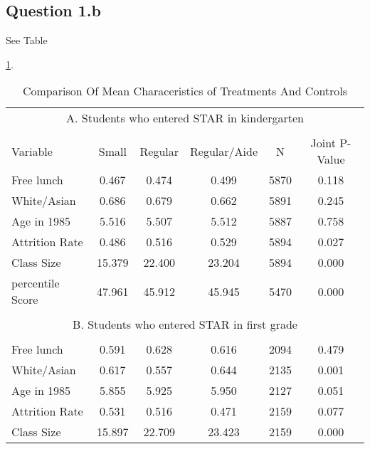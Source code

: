 \documentclass{article}
\begin{document}
{{\subsection*{Question 1.b}

See Table {\ref{tab:sub3}.


\begin{table}[htbp]
  \centering
  \caption{Comparison Of Mean Characeristics of Treatments And Controls}
  \label{tab:sub3}
    \begin{tabular}{llccccc}
    \toprule
    \multicolumn{7}{c}{A. Students who entered STAR in kindergarten} \\
          &       &       &       &       &       &  \\
    \multicolumn{2}{l}{Variable} & Small & Regular & Regular/Aide & N     & Joint P-Value \\
    \midrule
    \multicolumn{2}{l}{Free lunch} & 0.467  & 0.474  & 0.499  & 5870  & 0.118  \\
    \multicolumn{2}{l}{White/Asian} & 0.686  & 0.679  & 0.662  & 5891  & 0.245  \\
    \multicolumn{2}{l}{Age in 1985} & 5.516  & 5.507  & 5.512  & 5887  & 0.758  \\
    \multicolumn{2}{l}{Attrition Rate} & 0.486  & 0.516  & 0.529  & 5894  & 0.027  \\
    \multicolumn{2}{l}{Class Size} & 15.379  & 22.400  & 23.204  & 5894  & 0.000  \\
    \multicolumn{2}{l}{percentile Score} & 47.961  & 45.912  & 45.945  & 5470  & 0.000  \\
          &       &       &       &       &       &  \\
    \multicolumn{7}{c}{B. Students who entered STAR in first grade} \\
    \multicolumn{2}{c}{} &       &       &       &       &  \\
    \multicolumn{2}{l}{Free lunch} & 0.591  & 0.628  & 0.616  & 2094  & 0.479  \\
    \multicolumn{2}{l}{White/Asian} & 0.617  & 0.557  & 0.644  & 2135  & 0.001  \\
    \multicolumn{2}{l}{Age in 1985} & 5.855  & 5.925  & 5.950  & 2127  & 0.051  \\
    \multicolumn{2}{l}{Attrition Rate} & 0.531  & 0.516  & 0.471  & 2159  & 0.077  \\
    \multicolumn{2}{l}{Class Size} & 15.897  & 22.709  & 23.423  & 2159  & 0.000  \\

\end{tabular}
\end{table}}}}
\end{document}
